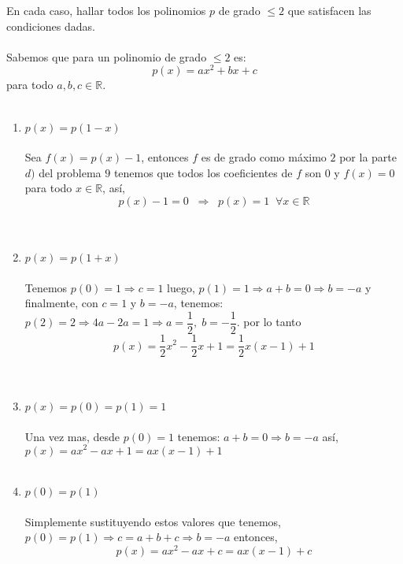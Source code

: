 \begin{ej}
En cada caso, hallar todos los polinomios $p$ de grado $\leq 2$ que satisfacen las condiciones dadas.\\\\
Sabemos que para un polinomio de grado $\leq 2$ es:
$$p(x) = ax^2 + bx + c$$ 
para todo $a,b,c \in \mathbb{R}$.\\\\
\begin{enumerate}[\bfseries a)]
\item $p(x) = p(1-x)$\\\\
Sea $f(x) = p(x) -1$, entonces $f$ es de grado como máximo $2$ por la parte $d)$ del problema $9$ tenemos que  todos los coeficientes de $f$ son $0$ \; y \; $f(x)=0$ para todo $x \in \mathbb{R}$, así,
$$p(x)-1 = 0 \; \; \Rightarrow \; \; p(x)=1 \; \; \forall x \in \mathbb{R}$$\\\\ 
\item $p(x) = p(1+x)$\\\\
Tenemos $p(0)=1 \Rightarrow c=1$ luego, $p(1)=1 \Rightarrow a+b=0 \Rightarrow b=-a$ y finalmente, con $c=1$ \; y \; $b=-a$, tenemos: $p(2)=2 \Rightarrow 4a-2a=1 \Rightarrow a=\dfrac{1}{2}, \; b=-\dfrac{1}{2}$. por lo tanto $$p(x)=\dfrac{1}{2}x^2 - \dfrac{1}{2}x + 1 = \dfrac{1}{2}x(x-1) + 1$$\\\\
\item $p(x) = p(0) = p(1) =1$\\\\
Una vez mas, desde $p(0)=1$ tenemos: $a+b=0 \Rightarrow b=-a$ así, $p(x) = ax^2 - ax + 1 = ax(x-1) + 1$\\\\
\item $p(0) = p(1)$\\\\
Simplemente sustituyendo estos valores que tenemos, $p(0)=p(1) \Rightarrow c=a+b+c \Rightarrow b=-a$ entonces, $$p(x) = ax^2 -ax + c = ax(x-1) + c$$\\\\
\end{enumerate}
\end{ej}

